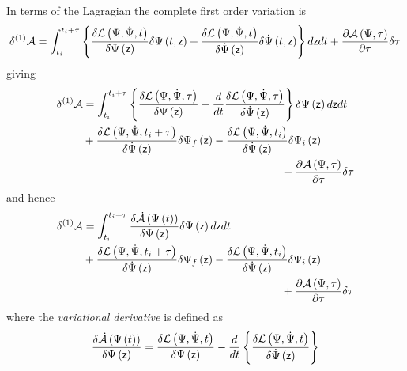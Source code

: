 \documentclass[aps,preprint]{revtex4}
\begin{document}
In terms of the Lagragian the complete first order variation is 
\begin{equation}
\delta ^{\left( 1\right) }\mathcal{A}=\int_{t_{i}}^{t_{i}+\tau }\left\{ 
\frac{\delta \mathcal{L}\left( \Psi ,\dot{\Psi},t\right) }{\delta \Psi
\left( \mathsf{z}\right) }\delta \Psi \left( t,\mathsf{z}\right) +\frac{%
\delta \mathcal{L}\left( \Psi ,\dot{\Psi},t\right) }{\delta \dot{\Psi}\left( 
\mathsf{z}\right) }\delta \dot{\Psi}\left( t,\mathsf{z}\right) \right\} d%
\mathsf{z}dt+\frac{\partial \mathcal{A}\left( \Psi ,\tau \right) }{\partial
\tau }\delta \tau
\end{equation}%
giving 
\begin{align}
\delta ^{\left( 1\right) }\mathcal{A}& =\int_{t_{i}}^{t_{i}+\tau }\left\{ 
\frac{\delta \mathcal{L}\left( \Psi ,\dot{\Psi},\tau \right) }{\delta \Psi
\left( \mathsf{z}\right) }-\frac{d}{dt}\frac{\delta \mathcal{L}\left( \Psi ,%
\dot{\Psi},\tau \right) }{\delta \dot{\Psi}\left( \mathsf{z}\right) }%
\right\} \delta \Psi \left( \mathsf{z}\right) d\mathsf{z}dt  \notag \\
& +\frac{\delta \mathcal{L}\left( \Psi ,\dot{\Psi},t_{i}+\tau \right) }{%
\delta \dot{\Psi}\left( \mathsf{z}\right) }\delta \Psi _{f}\left( \mathsf{z}%
\right) -\frac{\delta \mathcal{L}\left( \Psi ,\dot{\Psi},t_{i}\right) }{%
\delta \dot{\Psi}\left( \mathsf{z}\right) }\delta \Psi _{i}\left( \mathsf{z}%
\right)  \notag \\
& \qquad \qquad \qquad \qquad \qquad \qquad \qquad \qquad \qquad +\frac{%
\partial \mathcal{A}\left( \Psi ,\tau \right) }{\partial \tau }\delta \tau
\end{align}%
and hence 
\begin{align}
\delta ^{\left( 1\right) }\mathcal{A}& =\int_{t_{i}}^{t_{i}+\tau }\frac{%
\delta \mathcal{\dot{A}}\left( \Psi \left( t\right) \right) }{\delta \Psi
\left( \mathsf{z}\right) }\delta \Psi \left( \mathsf{z}\right) d\mathsf{z}dt
\notag \\
& +\frac{\delta \mathcal{L}\left( \Psi ,\dot{\Psi},t_{i}+\tau \right) }{%
\delta \dot{\Psi}\left( \mathsf{z}\right) }\delta \Psi _{f}\left( \mathsf{z}%
\right) -\frac{\delta \mathcal{L}\left( \Psi ,\dot{\Psi},t_{i}\right) }{%
\delta \dot{\Psi}\left( \mathsf{z}\right) }\delta \Psi _{i}\left( \mathsf{z}%
\right)  \notag \\
& \qquad \qquad \qquad \qquad \qquad \qquad \qquad \qquad \qquad +\frac{%
\partial \mathcal{A}\left( \Psi ,\tau \right) }{\partial \tau }\delta \tau
\end{align}%
where the \textit{variational derivative }is defined as 
\begin{equation}
\frac{\delta \mathcal{\dot{A}}\left( \Psi \left( t\right) \right) }{\delta
\Psi \left( \mathsf{z}\right) }=\frac{\delta \mathcal{L}\left( \Psi ,\dot{%
\Psi},t\right) }{\delta \Psi \left( \mathsf{z}\right) }-\frac{d}{dt}\left\{ 
\frac{\delta \mathcal{L}\left( \Psi ,\dot{\Psi},t\right) }{\delta \dot{\Psi}%
\left( \mathsf{z}\right) }\right\}
\end{equation}
\end{document}
